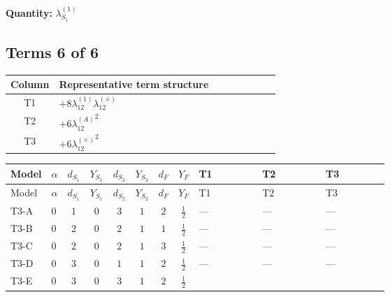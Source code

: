 \documentclass[8pt]{article}
\begin{document}
\begin{landscape}
\begin{longtable}{@{}llcccccc >{\raggedright\arraybackslash}p{0.21\linewidth} >{\raggedright\arraybackslash}p{0.21\linewidth} >{\raggedright\arraybackslash}p{0.21\linewidth}@{}}
\midrule
\bottomrule
\end{longtable}
\clearpage
\noindent\textbf{Quantity: }$\lambda_{S_1}^{(1)}$\par\smallskip
\subsection*{Terms 6 of 6}
\begin{center}
\begin{tabular}{@{}c >{\raggedright\arraybackslash}p{0.82\linewidth}@{}}
\toprule
Column & Representative term structure \\
\midrule
T1 & \(\displaystyle +8 {\lambda_{12}^{(1)}} {\lambda_{12}^{(\times)}}\) \\
\midrule
T2 & \(\displaystyle +6 {\lambda_{12}^{(A)}}^2\) \\
\midrule
T3 & \(\displaystyle +6 {\lambda_{12}^{(\times)}}^2\) \\
\midrule
\bottomrule
\end{tabular}
\end{center}
\smallskip
\tiny
\begin{longtable}{@{}llcccccc >{\raggedright\arraybackslash}p{0.21\linewidth} >{\raggedright\arraybackslash}p{0.21\linewidth} >{\raggedright\arraybackslash}p{0.21\linewidth}@{}}
\toprule
Model & $\alpha$ & $d_{S_1}$ & $Y_{S_1}$ & $d_{S_2}$ & $Y_{S_2}$ & $d_F$ & $Y_F$ & T1 & T2 & T3 \\
\midrule
\endfirsthead
\toprule
Model & $\alpha$ & $d_{S_1}$ & $Y_{S_1}$ & $d_{S_2}$ & $Y_{S_2}$ & $d_F$ & $Y_F$ & T1 & T2 & T3 \\
\midrule
\endhead
T3-A & $0$ & $1$ & $0$ & $3$ & $1$ & $2$ & $\frac{1}{2}$ & --- & --- & --- \\
\midrule
T3-B & $0$ & $2$ & $0$ & $2$ & $1$ & $1$ & $\frac{1}{2}$ & --- & --- & --- \\
\midrule
T3-C & $0$ & $2$ & $0$ & $2$ & $1$ & $3$ & $\frac{1}{2}$ & --- & --- & --- \\
\midrule
T3-D & $0$ & $3$ & $0$ & $1$ & $1$ & $2$ & $\frac{1}{2}$ & --- & --- & --- \\
\midrule
T3-E & $0$ & $3$ & $0$ & $3$ & $1$ & $2$ & $\frac{1}{2}$ & \scriptsize\adjustbox{max width=\linewidth}{$\begin{gathered} +8 {\lambda_{12}^{(1)}} {\lambda_{12}^{(\times)}}\end{gathered}$} & \scriptsize\adjustbox{max width=\linewidth}{$\begin{gathered} +6 {\lambda_{12}^{(A)}}^2\end{gathered}$} & \scriptsize\adjustbox{max width=\linewidth}{$\begin{gathered} +6 {\lambda_{12}^{(\times)}}^2\end{gathered}$} \\
\midrule
\bottomrule
\end{longtable}
\clearpage

\end{landscape}
\end{document}
